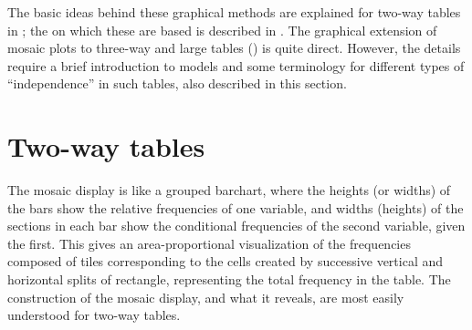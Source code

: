 \documentclass[10pt,krantz2]{krantz}\usepackage[]{graphicx}\usepackage[]{color}
\begin{document}
The basic ideas behind these graphical methods are explained for two-way tables in
; the  on which these are
based is described in . The graphical extension of
mosaic plots to three-way and large tables () is quite direct.
However, the details require a brief introduction to \loglin models and some terminology
for different types of ``independence'' in such tables, also described in this section.

\section{Two-way tables}\label{sec:mosaic-twoway}

The mosaic display
\citep{Friendly:92b,Friendly:94a,Friendly:97,HartiganKleiner:81,HartiganKleiner:84}
is like a grouped barchart,
where the heights (or widths) of the bars show the relative frequencies of one
variable, and widths (heights) of the sections in each bar show the
conditional frequencies of the second variable, given the first.
This gives an area-proportional visualization of the frequencies
composed of tiles corresponding to the cells created by successive
vertical and horizontal splits of rectangle, representing the total
frequency in the table.
The construction of the mosaic display, and what it reveals,
are most easily understood for two-way tables.
\end{document}

